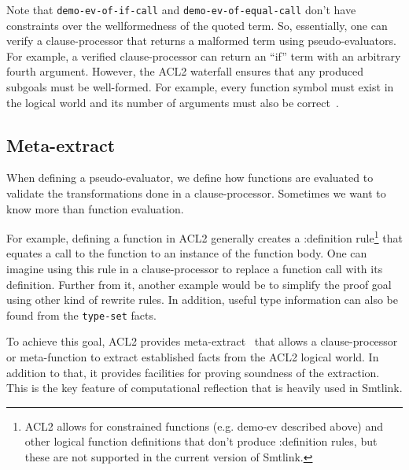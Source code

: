 Note that \texttt{demo-ev-of-if-call} and \texttt{demo-ev-of-equal-call} don't
have constraints over the wellformedness of the quoted term. So, essentially,
one can verify a clause-processor that returns a malformed term using
pseudo-evaluators. For example, a verified clause-processor can return an ``if''
term with an arbitrary fourth argument.
However, the ACL2 waterfall ensures that any produced subgoals must be
well-formed. For example, every function symbol must exist in the logical world
and its number of arguments must also be correct~\cite{kaufmann2015, termp}.

\subsection{Meta-extract}
When defining a pseudo-evaluator, we define how functions are evaluated to
validate the transformations done in a clause-processor. Sometimes we want to
know more than function evaluation.

For example, defining a function in ACL2 generally creates a :definition
rule\footnote{ACL2 allows for constrained functions (e.g. demo-ev described
  above) and other logical function definitions that don’t produce :definition
  rules, but these are not supported in the current version of Smtlink.} that
equates a call to the function to an instance of the function body.
One can imagine using this rule in a clause-processor to replace a function call
with its definition.
Further from it, another example would be to simplify the proof goal using
other kind of rewrite rules. In addition, useful type information can also be
found from the \texttt{type-set} facts.

To achieve this goal, ACL2 provides meta-extract~\cite{meta-extract} that allows
a clause-processor or meta-function to extract established facts from the ACL2
logical world. In addition to that, it provides facilities for proving soundness
of the extraction. This is the key feature of computational reflection that is
heavily used in Smtlink.

